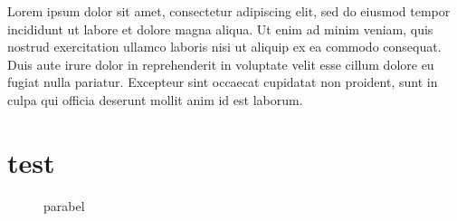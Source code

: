 \documentclass{article}
\begin{document}
\tableofcontents

Lorem ipsum dolor sit amet, consectetur adipiscing elit, sed do eiusmod tempor incididunt ut labore et dolore magna aliqua. Ut enim ad minim veniam, quis nostrud exercitation ullamco laboris nisi ut aliquip ex ea commodo consequat. Duis aute irure dolor in reprehenderit in voluptate velit esse cillum dolore eu fugiat nulla pariatur. Excepteur sint occaecat cupidatat non proident, sunt in culpa qui officia deserunt mollit anim id est laborum.

\section{test}


\begin{figure}[htb]
    \centering
    \caption{parabel}
    \label{fig:parabel}
\end{figure}
\end{document}
